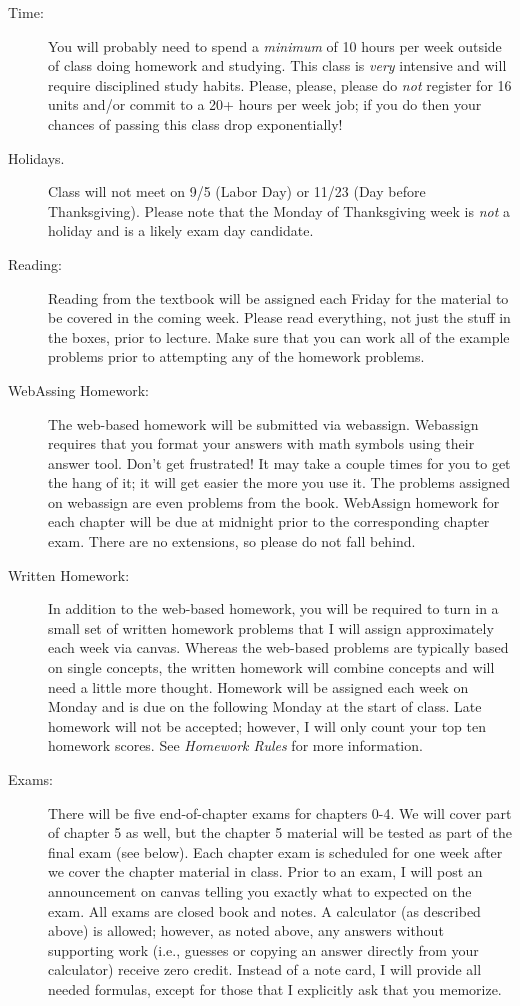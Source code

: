 \documentclass[letterpaper,12pt,fleqn]{article}
\begin{document}
\begin{description}
\item[Time:] You will probably need to spend a \emph{minimum} of 10 hours per
  week outside of class doing homework and studying. This class is \emph{very}
  intensive and will require disciplined study habits. Please, please, please
  do \emph{not} register for 16 units and/or commit to a 20+ hours per week
  job; if you do then your chances of passing this class drop exponentially!

\item[Holidays.] Class will not meet on 9/5 (Labor Day) or 11/23 (Day before
  Thanksgiving). Please note that the Monday of Thanksgiving week is
  \emph{not} a holiday and is a likely exam day candidate.

\item[Reading:] Reading from the textbook will be assigned each Friday for the
  material to be covered in the coming week. Please read everything, not
  just the stuff in the boxes, prior to lecture. Make sure that you can work
  all of the example problems prior to attempting any of the homework problems.

\item[WebAssing Homework:] The web-based homework will be submitted via
  webassign. Webassign requires that you format your answers with math symbols
  using their answer tool. Don't get frustrated! It may take a couple times for
  you to get the hang of it; it will get easier the more you use it. The
  problems assigned on webassign are even problems from the book. WebAssign
  homework for each chapter will be due at midnight prior to the corresponding
  chapter exam. There are no extensions, so please do not fall behind.

\item[Written Homework:] In addition to the web-based homework, you will be
  required to turn in a small set of written homework problems that I will
  assign approximately each week via canvas. Whereas the web-based problems are
  typically based on single concepts, the written homework will combine
  concepts and will need a little more thought. Homework will be assigned each
  week on Monday and is due on the following Monday at the start of class. Late
  homework will not be accepted; however, I will only count your top ten
  homework scores. See \emph{Homework Rules} for more information.

\item[Exams:] There will be five end-of-chapter exams for chapters 0-4. We will
  cover part of chapter 5 as well, but the chapter 5 material will be tested as
  part of the final exam (see below). Each chapter exam is scheduled for one
  week after we cover the chapter material in class. Prior to an exam, I will
  post an announcement on canvas telling you exactly what to expected on the
  exam. All exams are closed book and notes. A calculator (as described above)
  is allowed; however, as noted above, any answers without supporting work
  (i.e., guesses or copying an answer directly from your calculator) receive
  zero credit. Instead of a note card, I will provide all needed formulas,
  except for those that I explicitly ask that you memorize.


\end{description}
\end{document}

